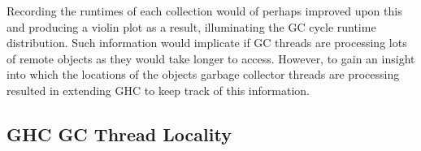\documentclass{paper}\usepackage{graphicx}
\begin{document}
\begin{table}[!htb]
  \centering
  \caption{Garbage Collection frequencies per region for data parallel implementation of \lstinline{sumeuler}. Measured by extensions to GHC GC.}
  \label{table:dp_freq}
\end{table}

\begin{table}[!htb]
  \centering
  \caption{Garbage Collection frequencies per region for \lstinline{prsa}. Measured by extensions to GHC GC.}
  \label{table:prsa_freq}
\end{table}

Recording the runtimes of each collection would of perhaps improved upon this and producing a violin plot as a result, illuminating the GC cycle runtime distribution. Such information would implicate if GC threads are processing lots of remote objects as they would take longer to access. However, to gain an insight into which the locations of the objects garbage collector threads are processing resulted in extending GHC to keep track of this information.

\subsection{GHC GC Thread Locality}
\label{sec:gc_thread_locality}
\end{document}
